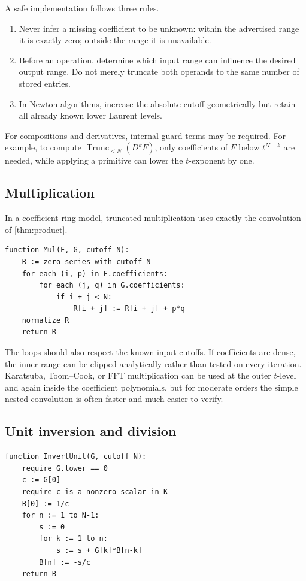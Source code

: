 \documentclass[11pt,oneside]{article}
\numberwithin{equation}{section}
\theoremstyle{definition}
\newcommand{\TransseriesTruncateBelow}[2]{%
  \operatorname{Trunc}_{<#2}\!\left(#1\right)%
}
\begin{document}
A safe implementation follows three rules.
\begin{enumerate}
\item Never infer a missing coefficient to be unknown: within the advertised
  range it is exactly zero; outside the range it is unavailable.
\item Before an operation, determine which input range can influence the desired
  output range.  Do not merely truncate both operands to the same number of
  stored entries.
\item In Newton algorithms, increase the absolute cutoff geometrically but
  retain all already known lower Laurent levels.
\end{enumerate}

For compositions and derivatives, internal guard terms may be required.  For
example, to compute \(\TransseriesTruncateBelow{D^kF}{N}\), only coefficients of \(F\) below
\(t^{N-k}\) are needed, while applying a primitive can lower the \(t\)-exponent
by one.

\subsection{Multiplication}

In a coefficient-ring model, truncated multiplication uses exactly the
convolution of \cref{thm:product}.

\begin{lstlisting}[style=pseudocode,caption={Naive truncated PL multiplication.}]
function Mul(F, G, cutoff N):
    R := zero series with cutoff N
    for each (i, p) in F.coefficients:
        for each (j, q) in G.coefficients:
            if i + j < N:
                R[i + j] := R[i + j] + p*q
    normalize R
    return R
\end{lstlisting}

The loops should also respect the known input cutoffs.  If coefficients are
dense, the inner range can be clipped analytically rather than tested on every
iteration.  Karatsuba, Toom--Cook, or FFT multiplication can be used at the
outer \(t\)-level and again inside the coefficient polynomials, but for moderate
orders the simple nested convolution is often faster and much easier to verify.

\subsection{Unit inversion and division}

\begin{lstlisting}[style=pseudocode,caption={Reciprocal of a PL unit starting at exponent zero.}]
function InvertUnit(G, cutoff N):
    require G.lower == 0
    c := G[0]
    require c is a nonzero scalar in K
    B[0] := 1/c
    for n := 1 to N-1:
        s := 0
        for k := 1 to n:
            s := s + G[k]*B[n-k]
        B[n] := -s/c
    return B
\end{lstlisting}
\end{document}
